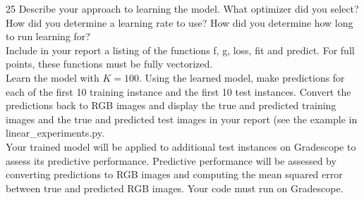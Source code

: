 \documentclass[11pt]{article}
\begin{document}
\begin{problem}{25}
 Describe your approach to learning the model. What optimizer did you select? How did you determine a learning rate to use? How did you determine how long to run learning for?\\

 Include in your report a listing of the functions f, g, loss, fit and predict. For full points, these functions must be fully vectorized.\\

 Learn the model with $K=100$. Using the learned model, make predictions for each of the first 10 training instance and the first 10 test instances. Convert the predictions back to RGB images and display the true and predicted training images and the true and predicted test images in your report (see the example in linear\_experiments.py.\\

 Your trained model will be applied to additional test instances on Gradescope to assess its predictive performance. Predictive performance will be assessed by converting predictions to RGB images and computing the mean squared error between true and predicted RGB images. Your code must run on Gradescope.\\

\end{problem}
\end{document}
